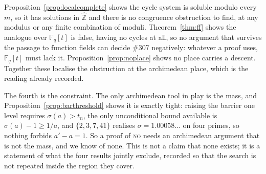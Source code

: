 \documentclass[11pt]{article}
\theoremstyle{definition}
\begin{document}
Proposition~\ref{prop:localcomplete} shows the cycle system is soluble modulo every $m$, so it has
solutions in $\widehat{\mathbb{Z}}$ and there is no congruence obstruction to find, at any modulus or
any finite combination of moduli. Theorem~\ref{thm:ff} shows the analogue over $\mathbb{F}_q[t]$ is
false, having no cycles at all, so no argument that survives the passage to function fields can
decide \#307 negatively: whatever a proof uses, $\mathbb{F}_q[t]$ must lack it.
Proposition~\ref{prop:noplace} shows no place carries a descent. Together these localise the
obstruction at the archimedean place, which is the reading already recorded.

The fourth is the constraint. The only archimedean tool in play is the mass, and
Proposition~\ref{prop:barthreshold} shows it is exactly tight: raising the barrier one level requires
$\sigma(a)>t_n$, the only unconditional bound available is $\sigma(a)-1\ge1/a$, and
$\{2,3,7,41\}$ realises $\sigma=1.00058\ldots$ on four primes, so nothing forbids $a'-a=1$. So a
proof of \textsc{no} needs an archimedean argument that is not the mass, and we know of none. This is
not a claim that none exists; it is a statement of what the four results jointly exclude, recorded so
that the search is not repeated inside the region they cover.
\end{document}
